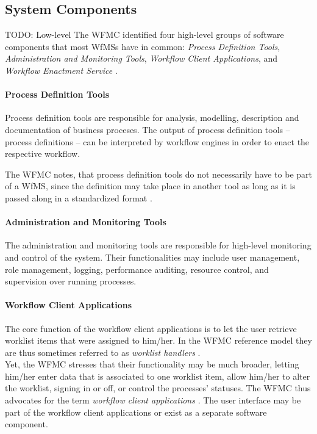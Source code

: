   \subsection{System Components} %
  \label{sub:system_components}

    TODO: Low-level
    The \ac{WFMC} identified four high-level groups of software components that most \acp{WfMS} have in common: \emph{Process Definition Tools}, \emph{Administration and Monitoring Tools}, \emph{Workflow Client Applications}, and \emph{Workflow Enactment Service} \cite{Hollingsworth1995Wfmc}.

    \paragraph{Process Definition Tools} %
    \label{par:process_definition_tool}
      Process definition tools are responsible for analysis, modelling, description and documentation of business proceses. The output of process definition tools -- process definitions -- can be interpreted by workflow engines in order to enact the respective workflow.

      The \ac{WFMC} notes, that process definition tools do not necessarily have to be part of a \ac{WfMS}, since the definition may take place in another tool as long as it is passed along in a standardized format \cite{Hollingsworth1995Wfmc}.

    \paragraph{Administration and Monitoring Tools} %
    \label{par:administration_and_monitoring_tools}

      The administration and monitoring tools are responsible for high-level monitoring and control of the system. Their functionalities may include user management, role management, logging, performance auditing, resource control, and supervision over running processes.

    \paragraph{Workflow Client Applications} %
    \label{par:workflow_client_applications}
      The core function of the workflow client applications is to let the user retrieve worklist items that were assigned to him/her. In the \ac{WFMC} reference model they are thus sometimes referred to as \emph{worklist handlers} \cite{Hollingsworth1995Wfmc}. \\
      Yet, the \ac{WFMC} stresses that their functionality may be much broader, \eg letting him/her enter data that is associated to one worklist item, allow him/her to alter the worklist, signing in or off, or control the processes' statuses. The \ac{WFMC} thus advocates for the term \emph{workflow client applications} \cite{Hollingsworth1995Wfmc}.
      The user interface may be part of the workflow client applications or exist as a separate software component.

